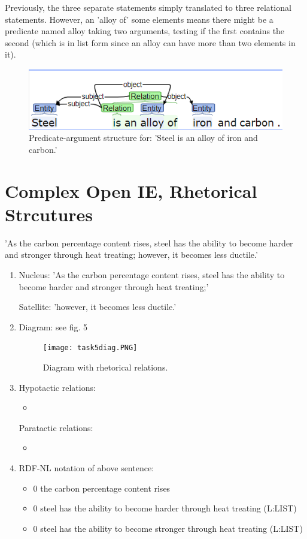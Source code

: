 \documentclass[12pt]{report}
\begin{document}
\begin{enumerate}
    Previously, the three separate statements simply translated to three
    relational statements. However, an 'alloy of' some elements means there
    might be a predicate named alloy taking two arguments, testing if the first
    contains the second (which is in list form since an alloy can have more
    than two elements in it).\par
  \begin{figure}[ht]
    \includegraphics[width=\linewidth]{task4pas.PNG}
    \caption{Predicate-argument structure for: 'Steel is an alloy of iron and
    carbon.'}
    \label{PAStruct}
  \end{figure}
\end{enumerate}

\section{Complex Open IE, Rhetorical Strcutures}
'As the carbon percentage content rises, steel has the ability to become harder
and stronger through heat treating; however, it becomes less ductile.'
\begin{enumerate}
  \item Nucleus: 'As the carbon percentage content rises, steel has the ability
  to become harder and stronger through heat treating;'\par
  Satellite: 'however, it becomes less ductile.'
  \item Diagram: see fig. 5
  \begin{figure}[ht]
    \texttt{[image: task5diag.PNG]}
    \caption{Diagram with rhetorical relations.}
    \label{PAStruct}
  \end{figure}
  \item Hypotactic relations:
  \begin{itemize}
    \item
  \end{itemize}
  Paratactic relations:
  \begin{itemize}
    \item
  \end{itemize}
  \item RDF-NL notation of above sentence:\par
  \begin{itemize}
    \item 0 the carbon percentage content   rises
    \item 0 steel   has the ability   to become harder through heat treating
    (L:LIST)
    \item 0 steel   has the ability   to become stronger through heat treating
    (L:LIST)
  \end{itemize}
\end{enumerate}
\end{document}
